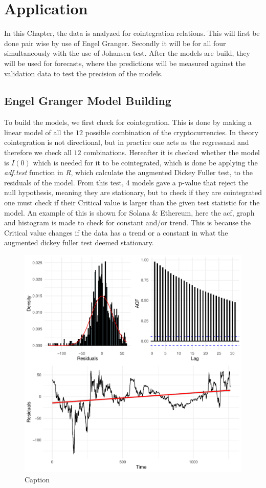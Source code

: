 \chapter{Application}
In this Chapter, the data is analyzed for cointegration relations. This will first be done pair wise by use of Engel Granger. Secondly it will be for all four simultaneously with the use of Johansen test. After the models are build, they will be used for forecasts, where the predictions will be measured against the validation data to test the precision of the models.


\section{Engel Granger Model Building}
To build the models, we first check for cointegration. This is done by making a linear model of all the $12$ possible combination of the cryptocurrencies. In theory cointegration is not directional, but in practice one acts as the regressand and therefore we check all $12$ combinations. Hereafter it is checked whether the model is $I(0)$ which is needed for it to be cointegrated, which is done be applying the \textit{adf.test} function in \textit{R}, which calculate the augmented Dickey Fuller test, to the residuals of the model. From this test, 4 models gave a p-value that reject the null hypothesis, meaning they are stationary, but to check if they are cointegrated one must check if their Critical value is larger than the given test statistic for the model. An example of this is shown for Solana \& Ethereum, here the acf, graph and histogram is made to check for constant and/or trend. This is because the Critical value changes if the data has a trend or a constant in what the augmented dickey fuller test deemed stationary.
\begin{figure}[h]
    \centering
    \includegraphics[width=0.4\linewidth]{1.Projekt_kode/Billeder/plot_grid_ADF_Solana-Ethereum.pdf}
    \caption{Caption}
    \label{fig:enter-label}
\end{figure}

